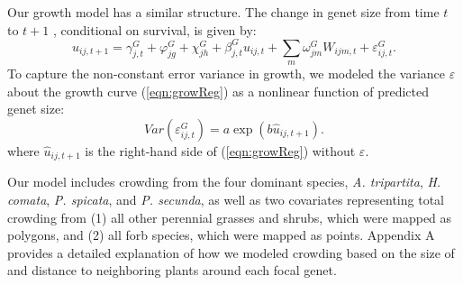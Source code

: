 \documentclass[11pt]{article}
\begin{document}
\begin{doublespacing}
Our growth model has a similar structure. The change in genet size from time $t$ to $t+1$ , conditional on survival, is given by:
\begin{equation}
u_{ij,t+1} = \gamma_{j,t}^G + \varphi_{jg}^G+  \chi_{jh}^G  + \beta_{j,t}^G u_{ij,t} + 
\sum \limits_{m} \omega_{jm}^G {W}_{ijm,t} + \varepsilon_{ij,t}^G .
\label{eqn:growReg}
\end{equation}
To capture the non-constant error variance in growth, we modeled the variance $\varepsilon$ about the growth 
curve (\ref{eqn:growReg}) as a nonlinear function of predicted genet size:
\begin{equation}
Var(\varepsilon_{ij,t}^G) = a \exp(b\hat{u}_{ij,t+1}).
\label{eqn:growVar}
\end{equation}
where $\hat{u}_{ij,t+1}$ is the right-hand side of (\ref{eqn:growReg}) without $\varepsilon$. 

Our model includes crowding from the four dominant species, \textit{A. tripartita}, \textit{H. comata}, \textit{P. spicata}, and \textit{P. secunda}, as well as two covariates representing total crowding from (1) all other perennial grasses and shrubs, which were mapped as polygons, and (2) all forb species, which were mapped as points. Appendix A provides a detailed explanation of how we modeled crowding based on the size of and distance to neighboring plants around each focal genet.


\end{doublespacing}
\end{document}
